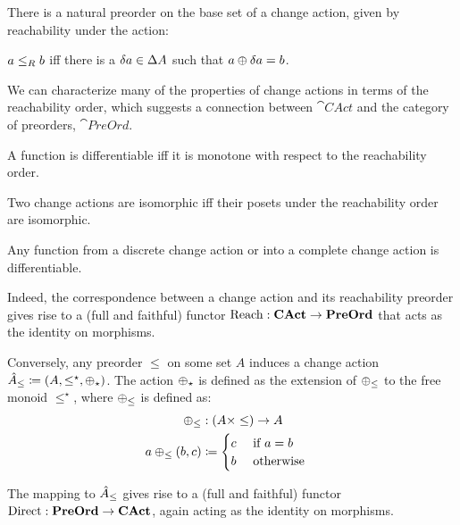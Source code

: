 There is a natural preorder on the base set of a change action, given by reachability
under the action:

\begin{defn}
  $a \leq_R b$ iff there is a $\delta a \in \Delta A$ such that $a \oplus
  \delta a = b$.
\end{defn}

We can characterize many of the properties of change actions in terms of the reachability order,
which suggests a connection between $\cat{CAct}$ and the category of preorders, $\cat{PreOrd}$.

\begin{prop}
  A function is differentiable iff it is monotone with respect to the
  reachability order. 
\end{prop}

\begin{corollary}
  Two change actions are isomorphic iff their posets under the reachability
  order are isomorphic.
\end{corollary}

\begin{corollary}
  Any function from a discrete change action or into a complete change
  action is differentiable.
\end{corollary}

Indeed, the correspondence between a change action and its reachability preorder gives rise to
a (full and faithful) functor $\operatorname{Reach} : \mathbf{CAct} \rightarrow \mathbf{PreOrd}$ that acts as the
identity on morphisms.

Conversely, any preorder $\leq$ on some set $A$ induces a change action
$\hat{A}_\leq \coloneqq (A,\leq^\star,\oplus_\star)$.
The action $\oplus_\star$ is defined as the extension of $\oplus_\leq$ to the free
monoid $\leq^\star$, where $\oplus_\leq$ is defined as:
\[
\begin{aligned}
   \oplus_\leq &: (A \times \leq) \rightarrow A&\\
   a \oplus_\leq (b, c) &\coloneqq
     \begin{cases}
     c&\text{ if $a = b$}\\
     b&\text{ otherwise}
     \end{cases}
\end{aligned}
\]

The mapping to $\hat{A}_\leq$ gives rise to a (full and faithful) functor
$\operatorname{Direct} : \mathbf{PreOrd} \rightarrow \mathbf{CAct}$, again acting as the identity on morphisms.

